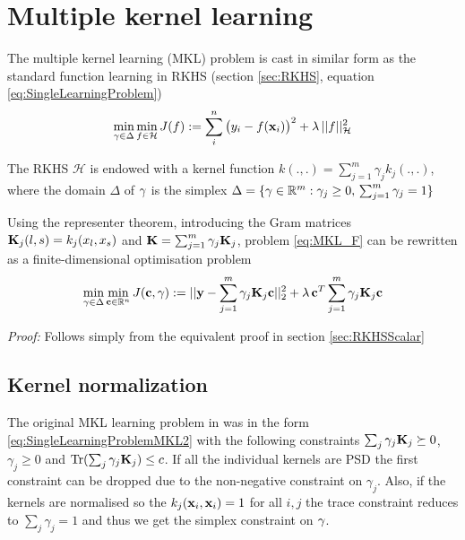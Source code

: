 
\clearpage

\section{Multiple kernel learning}\label{sec:MKL}

The multiple kernel learning (MKL) problem is cast in similar form as the standard function learning in RKHS (section \ref{sec:RKHS}, equation \eqref{eq:SingleLearningProblem})
\begin{equation}\label{eq:MKL_F}
 \min_{\gamma \in \Delta} \min_{f \in \mathcal{H}} J(f) := \sum_i^n \big( y_i - f(\mathbf{x}_i) \big)^2 + \lambda \, ||f||_\mathcal{H}^2
\end{equation}

The RKHS $\mathcal{H}$ is endowed with a kernel function $k(.,.) = \sum_{j=1}^m \gamma_j k_j(.,.)$, where the domain $\Delta$ of $\mathbf{\gamma}$ is the simplex $\Delta = \{ \mathbf{\gamma} \in \mathbb{R}^m:  \gamma_j \geq 0, \, \sum_{j=1}^m \gamma_j = 1\}$

Using the representer theorem, introducing the Gram matrices $\mathbf{K}_j(l,s) = k_j(x_l,x_s)$ and $\mathbf{K} = \sum_{j=1}^m \gamma_j \mathbf{K}_j$, problem \eqref{eq:MKL_F} can be rewritten as a finite-dimensional optimisation problem
\begin{equation}\label{eq:MKL_K}
\min_{\gamma \in \Delta} \min_{\mathbf{c} \in \mathbb{R}^n} J(\mathbf{c},\mathbf{\gamma}):= ||\mathbf{y} - \sum_{j=1}^m \gamma_j \mathbf{K}_j \mathbf{c}||_2^2 +
\lambda \, \mathbf{c}^T \sum_{j=1}^m \gamma_j \mathbf{K}_j \mathbf{c} 
\end{equation}

\begin{small}
\emph{Proof:} Follows simply from the equivalent proof in section \ref{sec:RKHSScalar}
\end{small}


\subsection{Kernel normalization}
The original MKL learning problem in \cite{Lanckriet2004} was in the form \eqref{eq:SingleLearningProblemMKL2} with the following constraints $\sum_j \gamma_j \mathbf{K}_j \succeq 0$, $\gamma_j \geq 0$ and $\operatorname*{Tr} (\sum_j \gamma_j \mathbf{K}_j ) \leq c$.
If all the individual kernels are PSD the first constraint can be dropped due to the non-negative constraint on $\gamma_j$.
Also, if the kernels are normalised so the $k_j(\mathbf{x}_i,\mathbf{x}_i)=1$ for all $i,j$ the trace constraint reduces to $\sum_j \gamma_j = 1$ and thus we get the simplex constraint on $\mathbf{\gamma}$.

